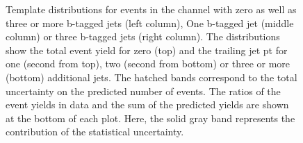 \begin{figure}[htbp!]
\begin{center}
\caption{Template distributions for events in the \emu channel with zero as well as three or
  more b-tagged jets (left column), One b-tagged jet (middle column) or three b-tagged jets (right column). The distributions show the total event yield for zero (top) and the trailing jet pt for one (second from top),
  two (second from bottom) or three or more (bottom) additional jets. 
  The hatched bands correspond to the total uncertainty on the predicted number of events. The ratios of the event yields in data and the sum of the
  predicted yields are shown at the bottom of each plot. Here, the solid
  gray band represents the contribution of the statistical uncertainty.  
       \label{fig:xsec_emu_inputdistr}}
  \end{center}
\end{figure}

